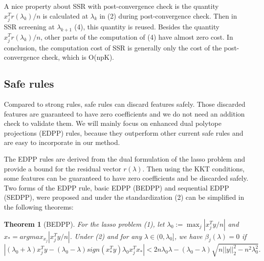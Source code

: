 \documentclass{article}
\newtheorem{theorem}{Theorem}[section]
\begin{document}
A nice property about SSR with post-convergence check is the quantity $x_j^Tr(\lambda_k)/n$ is calculated at $\lambda_k$ in (2) during post-convergence check. Then in SSR screening at $\lambda_{k+1}$ (4), this quantity is reused. Besides the quantity $x_j^Tr(\lambda_k)/n$, other parts of the computation of (4) have almost zero cost. In conclusion, the computation cost of SSR is generally only the cost of the post-convergence check, which is O(npK).

\subsection{Safe rules}

Compared to strong rules, safe rules can discard features safely. Those discarded features are guaranteed to have zero coefficients and we do not need an addition check to validate them. We will mainly focus on enhanced dual polytope projections (EDPP) rules\citep{wang2013lasso}, because they outperform other current safe rules and are easy to incorporate in our method.

The EDPP rules are derived from the dual formulation of the lasso problem and provide a bound for the residual vector $r(\lambda)$. Then using the KKT conditions, some features can be guaranteed to have zero coefficients and be discarded safely. Two forms of the EDPP rule, basic EDPP (BEDPP) and sequential EDPP (SEDPP)\citep{wang2013lasso}, were proposed and under the standardization (2) can be simplified in the following theorems\citep{zeng2017efficient}:

\begin{theorem}[BEDPP]
    For the lasso problem (1), let $\lambda_0:=\max_j|x_j^Ty/n|$ and $x_*=argmax_{x_j}|x_j^Ty/n|$. Under (2) and for any $\lambda\in(0,\lambda_0]$, we have $\hat{\beta}_j(\lambda)=0$ if
    \begin{equation}
        |(\lambda_0+\lambda)x_j^Ty-(\lambda_0-\lambda)sign(x_*^Ty)\lambda_0x_j^Tx_*|<2n\lambda_0\lambda-(\lambda_0-\lambda)\sqrt{n||y||_2^2-n^2\lambda_0^2}.
    \end{equation}
\end{theorem}
\end{document}
